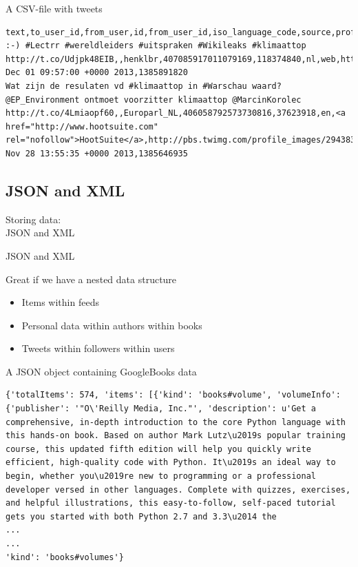 \documentclass{beamer}
\begin{document}
{\begin{frame}[fragile]{A CSV-file with tweets}
\begin{lstlisting}
text,to_user_id,from_user,id,from_user_id,iso_language_code,source,profile_image_url,geo_type,geo_coordinates_0,geo_coordinates_1,created_at,time
:-) #Lectrr #wereldleiders #uitspraken #Wikileaks #klimaattop http://t.co/Udjpk48EIB,,henklbr,407085917011079169,118374840,nl,web,http://pbs.twimg.com/profile_images/378800000673845195/b47785b1595e6a1c63b93e463f3d0ccc_normal.jpeg,,0,0,Sun Dec 01 09:57:00 +0000 2013,1385891820
Wat zijn de resulaten vd #klimaattop in #Warschau waard? @EP_Environment ontmoet voorzitter klimaattop @MarcinKorolec http://t.co/4Lmiaopf60,,Europarl_NL,406058792573730816,37623918,en,<a href="http://www.hootsuite.com" rel="nofollow">HootSuite</a>,http://pbs.twimg.com/profile_images/2943831271/b6631b23a86502fae808ca3efde23d0d_normal.png,,0,0,Thu Nov 28 13:55:35 +0000 2013,1385646935\end{lstlisting}
\end{frame}



\subsection{JSON and XML}
\begin{frame}
Storing data:\\
JSON and XML
\end{frame}

\begin{frame}{JSON and XML}
\begin{block}{Great if we have a nested data structure}
\begin{itemize}
\item<2-> Items within feeds
\item<3-> Personal data within authors within books
\item<4-> Tweets within followers within users
\end{itemize}
\end{block}
\end{frame}




\begin{frame}[fragile]{A JSON object containing GoogleBooks data}
\begin{lstlisting}
{'totalItems': 574, 'items': [{'kind': 'books#volume', 'volumeInfo': {'publisher': '"O\'Reilly Media, Inc."', 'description': u'Get a comprehensive, in-depth introduction to the core Python language with this hands-on book. Based on author Mark Lutz\u2019s popular training course, this updated fifth edition will help you quickly write efficient, high-quality code with Python. It\u2019s an ideal way to begin, whether you\u2019re new to programming or a professional developer versed in other languages. Complete with quizzes, exercises, and helpful illustrations, this easy-to-follow, self-paced tutorial gets you started with both Python 2.7 and 3.3\u2014 the
...
...
'kind': 'books#volumes'}
\end{lstlisting}
\end{frame}

}
\end{document}
